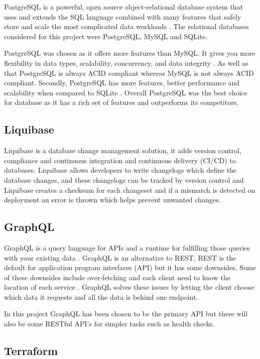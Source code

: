 \documentclass[]{project_report}
\begin{document}
PostgreSQL is a powerful, open source object-relational database system that uses and extends the SQL language combined with many features that safely store and scale the most complicated data workloads \cite{postgresql}. The relational databases considered for this project were PostgreSQL, MySQL and SQLite. 

PostgreSQL was chosen as it offers more features than MySQL. It gives you more flexibility in data types, scalability, concurrency, and data integrity \cite{mysql_vs_postgres}. As well as that PostgreSQL is always ACID compliant \cite{mysql_vs_postgres} whereas MySQL is not always ACID compliant. Secondly, PostgreSQL has more features, better performance and scalability when compared to SQLite \cite{sqlite_vs_postgres}. Overall PostgreSQL was the best choice for database as it has a rich set of features and outperforms its competitors.

\subsection{Liquibase}

Liquibase is a database change management solution, it adds version control, compliance and continuous integration and continuous delivery (CI/CD) to databases. Liquibase allows developers to write changelogs which define the database changes, and these changelogs can be tracked by version control and Liquibase creates a checksum for each changeset and if a mismatch is detected on deployment an error is thrown which helps prevent unwanted changes.

\subsection{GraphQL}

GraphQL is a query language for APIs and a runtime for fulfilling those queries with your existing data \cite{graphql}. GraphQL is an alternative to REST, REST is the default for application program interfaces (API) but it has some downsides. Some of these downsides include over-fetching and each client need to know the location of each service \cite{why_graphql}. GraphQL solves these issues by letting the client choose which data it requests and all the data is behind one endpoint. 

In this project GraphQL has been chosen to be the primary API but there will also be some RESTful API's for simpler tasks such as health checks.


\subsection{Terraform}
\end{document}
